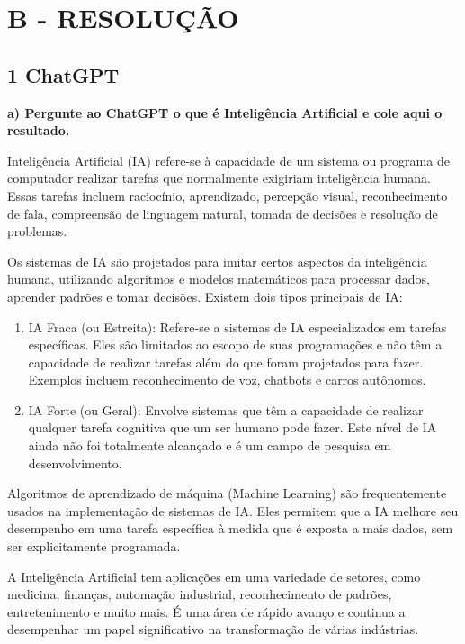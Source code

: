 \section*{\textbf{B - RESOLUÇÃO}}
\setcounter{subsection}{0}

\subsection*{\textbf{1 ChatGPT}}
\begin{adjustwidth}{1em}{}
\textbf{a) Pergunte ao ChatGPT o que é Inteligência Artificial e cole aqui o resultado.}
\end{adjustwidth}

Inteligência Artificial (IA) refere-se à capacidade de um sistema ou programa de computador realizar tarefas que normalmente exigiriam inteligência humana. Essas tarefas incluem raciocínio, aprendizado, percepção visual, reconhecimento de fala, compreensão de linguagem natural, tomada de decisões e resolução de problemas.

Os sistemas de IA são projetados para imitar certos aspectos da inteligência humana, utilizando algoritmos e modelos matemáticos para processar dados, aprender padrões e tomar decisões. Existem dois tipos principais de IA:

\begin{enumerate}
    \item IA Fraca (ou Estreita): Refere-se a sistemas de IA especializados em tarefas específicas. Eles são limitados ao escopo de suas programações e não têm a capacidade de realizar tarefas além do que foram projetados para fazer. Exemplos incluem reconhecimento de voz, chatbots e carros autônomos.
    \item IA Forte (ou Geral): Envolve sistemas que têm a capacidade de realizar qualquer tarefa cognitiva que um ser humano pode fazer. Este nível de IA ainda não foi totalmente alcançado e é um campo de pesquisa em desenvolvimento.
\end{enumerate}
    
Algoritmos de aprendizado de máquina (Machine Learning) são frequentemente usados na implementação de sistemas de IA. Eles permitem que a IA melhore seu desempenho em uma tarefa específica à medida que é exposta a mais dados, sem ser explicitamente programada.

A Inteligência Artificial tem aplicações em uma variedade de setores, como medicina, finanças, automação industrial, reconhecimento de padrões, entretenimento e muito mais. É uma área de rápido avanço e continua a desempenhar um papel significativo na transformação de várias indústrias.

